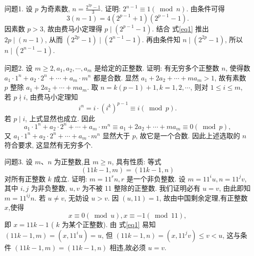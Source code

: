 
问题1. 设 $p$ 为奇素数, $n=\frac{2^{2 p}-1}{3}$. 证明: $2^{n-1} \equiv 1(\bmod n)$.
由条件可得
$$
3(n-1)=4\left(2^{p-1}+1\right)\left(2^{p-1}-1\right) . \label{eq1}
$$
因素数 $p>3$, 故由费马小定理得 $p \mid\left(2^{p-1}-1\right)$. 结合 式\ref{eq1} 推出 $2 p \mid(n-1)$, 从而 $\left(2^{2 p}-1\right) \mid\left(2^{n-1}-1\right)$. 再由条件知 $n \mid\left(2^{2 p}-1\right)$, 所以 $n \mid\left(2^{n-1}-1\right)$.



问题2. 设 $m \geqslant 2, a_1, a_2, \cdots, a_m$ 是给定的正整数.
证明: 有无穷多个正整数 $n$, 使得数 $a_1 \cdot 1^n+a_2 \cdot 2^n+\cdots+a_m \cdot m^n$ 都是合数.
显然 $a_1+2 a_2+\cdots+m a_m>1$, 故有素数 $p$ 整除 $a_1+2 a_2+\cdots+m a_m$. 取 $n=k(p-1)+1, k=1,2, \cdots$, 则对 $1 \leqslant i \leqslant m$, 若 $p \nmid i$, 由费马小定理知
$$
i^n=i \cdot\left(i^k\right)^{p-1} \equiv i(\bmod p) .
$$
若 $p \mid i$, 上式显然也成立.
因此
$$
a_1 \cdot 1^n+a_2 \cdot 2^n+\cdots+a_m \cdot m^n \equiv a_1+2 a_2+\cdots+m a_m \equiv 0(\bmod p),
$$
又 $a_1 \cdot 1^n+a_2 \cdot 2^n+\cdots+a_m \cdot m^n$ 显然大于 $p$, 故它是一个合数.
因此上述选取的 $n$ 符合要求, 这显然有无穷多个.



问题3. 设 $m 、 n$ 为正整数,且 $m \geqslant n$, 具有性质: 等式
$$
(11 k-1, m)=(11 k-1, n)
$$
对所有正整数 $k$ 成立.
证明: $m=11^r n, r$ 是一个非负整数.
设 $m=11^i u, n=11^j v$, 其中 $i, j$ 为非负整数, $u, v$ 为不被 11 整除的正整数.
我们证明必有 $u=v$, 由此即知 $m=11^{i j} n$. 若 $u \neq v$, 无妨设 $u>v$. 因 $(u, 11)=1$, 故由中国剩余定理,有正整数 $x$,使得
$$
x \equiv 0(\bmod u), x \equiv-1(\bmod 11), \label{eq1}
$$
即 $x=11 k-1$ ( $k$ 为某个正整数). 由 式\ref{eq1} 易知 $(11 k-1, m)=\left(x, 11^i u\right)=u$, 但 $(11 k-1, n)=\left(x, 11^j v\right) \leqslant v<u$, 这与条件 $(11 k-1, m)=(11 k-1, n)$ 相违,故必须 $u=v$.


